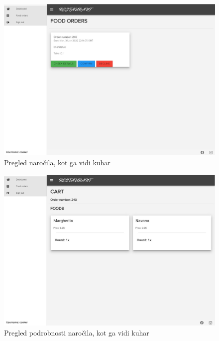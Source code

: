 \documentclass[a4paper, 12pt]{book}
\begin{document}
\begin{figure}
\centering
\includegraphics[width=12cm]{order_6.jpg}
\caption{Pregled naročila, kot ga vidi kuhar}
\label{Opis4}
\end{figure}
\begin{figure}
\centering
\includegraphics[width=12cm]{order_7.jpg}
\caption{Pregled podrobnosti naročila, kot ga vidi kuhar}
\label{Opis44}
\end{figure}
\end{document}
